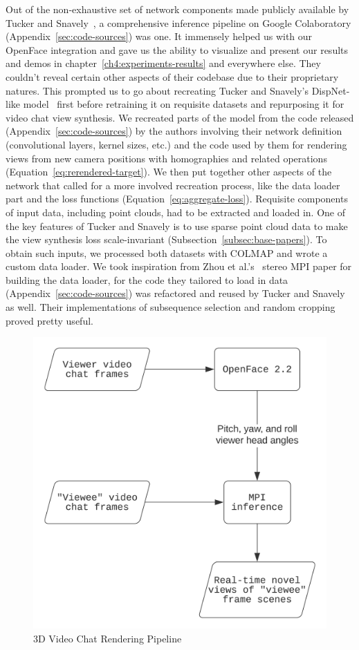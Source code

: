 Out of the non-exhaustive set of network components made publicly available by Tucker and Snavely~\cite{single_view_mpi}, a comprehensive inference pipeline on Google Colaboratory (Appendix~\ref{sec:code-sources}) was one. It immensely helped us with our OpenFace integration and gave us the ability to visualize and present our results and demos in chapter~\ref{ch4:experiments-results} and everywhere else. They couldn't reveal certain other aspects of their codebase due to their proprietary natures. This prompted us to go about recreating Tucker and Snavely's DispNet-like model~\cite{mayer_large_2016} first before retraining it on requisite datasets and repurposing it for video chat view synthesis. We recreated parts of the model from the code released (Appendix~\ref{sec:code-sources}) by the authors involving their network definition (convolutional layers, kernel sizes, etc.) and the code used by them for rendering views from new camera positions with homographies and related operations (Equation~\ref{eq:rerendered-target}). We then put together other aspects of the network that called for a more involved recreation process, like the data loader part and the loss functions (Equation~\ref{eq:aggregate-loss}). Requisite components of input data, including point clouds, had to be extracted and loaded in. One of the key features of Tucker and Snavely is to use sparse point cloud data to make the view synthesis loss scale-invariant (Subsection~\ref{subsec:base-papers}). To obtain such inputs, we processed both datasets with COLMAP and wrote a custom data loader. We took inspiration from Zhou et al.'s~\cite{zhou2018stereo} stereo MPI paper for building the data loader, for the code they tailored to load in data (Appendix~\ref{sec:code-sources}) was refactored and reused by Tucker and Snavely as well. Their implementations of subsequence selection and random cropping proved pretty useful.

\begin{figure}[!h]
    \includegraphics[width=0.60\columnwidth]{figures/3d-video-chat-rendering-pipeline.png}
    \caption{3D Video Chat Rendering Pipeline}
    \label{fig:3d-video-chat-rendering-pipeline}
\end{figure}

